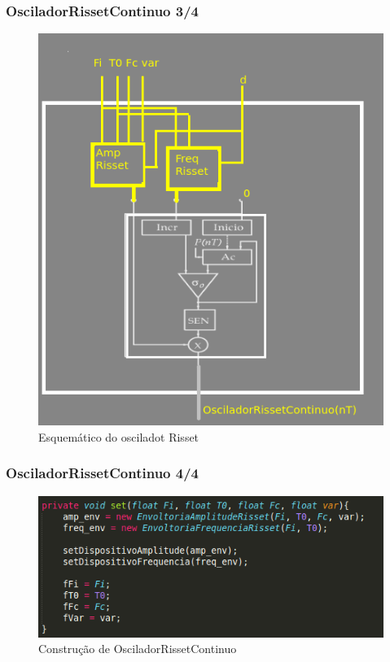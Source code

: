 \documentclass{beamer}
\begin{document}
\begin{frame}
 \frametitle{OsciladorRissetContinuo 3/4}
 \begin{figure}
  \includegraphics[scale=0.4]{./images/osciRisset_esquema.png}
  \caption{Esquemático do osciladot Risset}
   \end{figure}
\end{frame}

\begin{frame}
 \frametitle{OsciladorRissetContinuo 4/4}
 \begin{figure}
  \includegraphics[scale=0.6]{./images/osciRisset_code.png}
  \caption{Construção de OsciladorRissetContinuo}
   \end{figure}
\end{frame}
\end{document}
